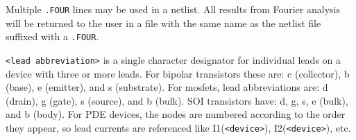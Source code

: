 \begin{Command}
\begin {Arguments}
\end{Arguments}

\comments
Multiple \texttt{.FOUR} lines may be used in a netlist.  All results from Fourier analysis will be 
returned to the user in a file with the same name as the netlist file suffixed with a \texttt{.FOUR}. 

\texttt{<lead abbreviation>} is a single character designator for individual
leads on a device with three or more leads.  For bipolar transistors these are:
c (collector), b (base), e (emitter), and s (substrate).  For mosfets, lead
abbreviations are: d (drain), g (gate), s (source), and b (bulk).  SOI
transistors have: d, g, s, e (bulk), and b (body).  For PDE devices, the nodes
are numbered according to the order they appear, so lead currents are
referenced like I1(\texttt{<device>}), I2(\texttt{<device>}), etc.

\end{Command}

